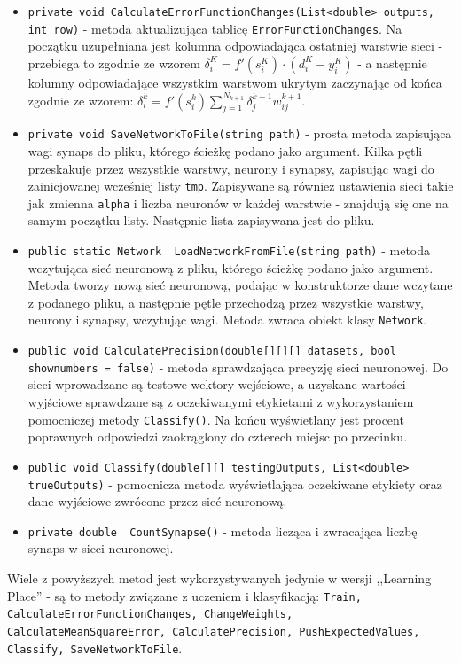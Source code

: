 \documentclass[12pt,a4paper]{article}
\begin{document}
\begin{itemize}
	    \item \lstinline{private void CalculateErrorFunctionChanges(List<double> outputs, int row)} - metoda aktualizująca tablicę \lstinline{ErrorFunctionChanges}. Na początku uzupełniana jest kolumna odpowiadająca ostatniej warstwie sieci - przebiega to zgodnie ze wzorem $\delta_i^K = f'(s^K_i) \cdot (d^K_{i} - y^K_{i})$ - a następnie kolumny odpowiadające wszystkim warstwom ukrytym zaczynając od końca zgodnie ze wzorem: $\delta_i^k = f'(s^k_i) \sum_{j=1}^{N_{k+1}} \delta^{k+1}_j w^{k+1}_{ij}$.
	    \item \lstinline{private void SaveNetworkToFile(string path)} - prosta metoda zapisująca wagi synaps do pliku, którego ścieżkę podano jako argument. Kilka pętli przeskakuje przez wszystkie warstwy, neurony i synapsy, zapisując wagi do zainicjowanej wcześniej listy \lstinline{tmp}. Zapisywane są również ustawienia sieci takie jak zmienna \lstinline{alpha} i liczba neuronów w każdej warstwie - znajdują się one na samym początku listy. Następnie lista zapisywana jest do pliku.
	    \item \lstinline{public static Network  LoadNetworkFromFile(string path)} - metoda wczytująca sieć neuronową z pliku, którego ścieżkę podano jako argument. Metoda tworzy nową sieć neuronową, podając w konstruktorze dane wczytane z podanego pliku, a następnie pętle przechodzą przez wszystkie warstwy, neurony i synapsy, wczytując wagi. Metoda zwraca obiekt klasy \lstinline{Network}.
	    \item \lstinline{public void CalculatePrecision(double[][][] datasets, bool shownumbers = false)} - metoda sprawdzająca precyzję sieci neuronowej. Do sieci wprowadzane są testowe wektory wejściowe, a uzyskane wartości wyjściowe sprawdzane są z oczekiwanymi etykietami z wykorzystaniem pomocniczej metody \lstinline{Classify()}. Na końcu wyświetlany jest procent poprawnych odpowiedzi zaokrąglony do czterech miejsc po przecinku.
	    \item \lstinline{public void Classify(double[][] testingOutputs, List<double> trueOutputs)} - pomocnicza metoda wyświetlająca oczekiwane etykiety oraz dane wyjściowe zwrócone przez sieć neuronową.
	    \item \lstinline{private double  CountSynapse()} - metoda licząca i zwracająca liczbę synaps w sieci neuronowej.
	\end{itemize}
	
Wiele z powyższych metod jest wykorzystywanych jedynie w wersji ,,Learning Place'' - są to metody związane z uczeniem i klasyfikacją: \lstinline{Train, CalculateErrorFunctionChanges, ChangeWeights, CalculateMeanSquareError, CalculatePrecision, PushExpectedValues, Classify, SaveNetworkToFile}.
\end{document}
